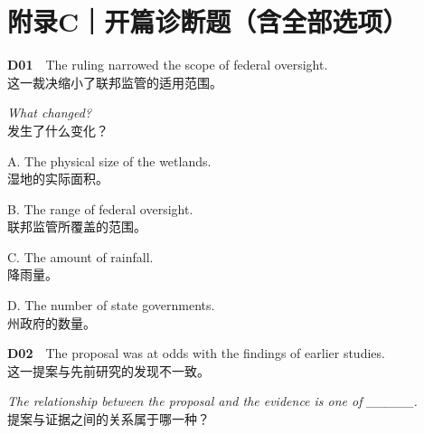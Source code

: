 \documentclass[a4paper,11pt,openany]{report}
\newcommand{\zhline}[1]{{\CJKsf\color{bodygrey}#1}}
\begin{document}
\section{附录C｜开篇诊断题（含全部选项）}\label{ux9644ux5f55cux5f00ux7bc7ux8bcaux65adux9898ux542bux5168ux90e8ux9009ux9879}

\begin{samepage}
\textbf{D01}　The ruling narrowed the scope of federal oversight.\\
\zhline{这一裁决缩小了联邦监管的适用范围。}
\par\end{samepage}

\begin{samepage}
\emph{What changed?}\\
\zhline{发生了什么变化？}
\par\end{samepage}

\begin{samepage}
A. The physical size of the wetlands.\\
\zhline{湿地的实际面积。}
\par\end{samepage}

\begin{samepage}
B. The range of federal oversight.\\
\zhline{联邦监管所覆盖的范围。}
\par\end{samepage}

\begin{samepage}
C. The amount of rainfall.\\
\zhline{降雨量。}
\par\end{samepage}

\begin{samepage}
D. The number of state governments.\\
\zhline{州政府的数量。}
\par\end{samepage}

\begin{samepage}
\textbf{D02}　The proposal was at odds with the findings of earlier studies.\\
\zhline{这一提案与先前研究的发现不一致。}
\par\end{samepage}

\begin{samepage}
\emph{The relationship between the proposal and the evidence is one of \_\_\_\_\_.}\\
\zhline{提案与证据之间的关系属于哪一种？}
\par\end{samepage}
\end{document}
